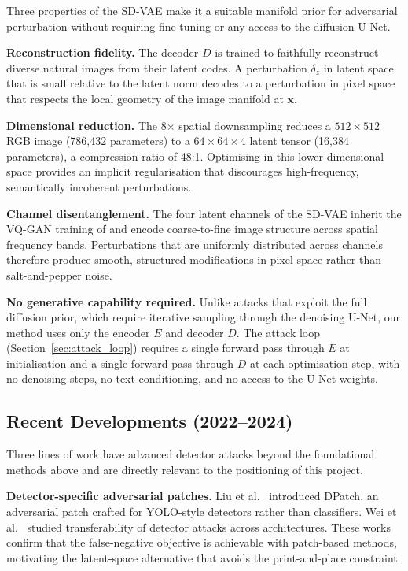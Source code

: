 \documentclass[12pt,a4paper]{report}
\begin{document}
Three properties of the SD-VAE make it a suitable manifold prior for
adversarial perturbation without requiring fine-tuning or any access to the
diffusion U-Net.

\textbf{Reconstruction fidelity.} The decoder $D$ is trained to faithfully
reconstruct diverse natural images from their latent codes. A perturbation
$\delta_z$ in latent space that is small relative to the latent norm decodes
to a perturbation in pixel space that respects the local geometry of the
image manifold at $\mathbf{x}$.

\textbf{Dimensional reduction.} The 8$\times$ spatial downsampling reduces
a $512 \times 512$ RGB image (786,432 parameters) to a
$64 \times 64 \times 4$ latent tensor (16,384 parameters), a compression
ratio of 48:1. Optimising in this lower-dimensional space provides an
implicit regularisation that discourages high-frequency, semantically
incoherent perturbations.

\textbf{Channel disentanglement.} The four latent channels of the SD-VAE
inherit the VQ-GAN training of \cite{esser2021taming} and encode
coarse-to-fine image structure across spatial frequency bands. Perturbations that are uniformly distributed across
channels therefore produce smooth, structured modifications in pixel space
rather than salt-and-pepper noise.

\textbf{No generative capability required.} Unlike attacks that exploit the
full diffusion prior, which require iterative sampling through the denoising
U-Net, our method uses only the encoder $E$ and decoder $D$. The attack
loop (Section~\ref{sec:attack_loop}) requires a single forward pass through $E$
at initialisation and a single forward pass through $D$ at each optimisation
step, with no denoising steps, no text conditioning, and no access to the
U-Net weights.

\subsection{Recent Developments (2022--2024)}
\label{subsec:recent}

Three lines of work have advanced detector attacks beyond the foundational
methods above and are directly relevant to the positioning of this project.

\textbf{Detector-specific adversarial patches.}
Liu et al.\ \cite{liu2019dpatch} introduced DPatch, an adversarial patch
crafted for YOLO-style detectors rather than classifiers. Wei et al.\
\cite{wei2019transferable} studied transferability of detector attacks
across architectures. These works confirm that the false-negative objective
is achievable with patch-based methods, motivating the latent-space
alternative that avoids the print-and-place constraint.
\end{document}
